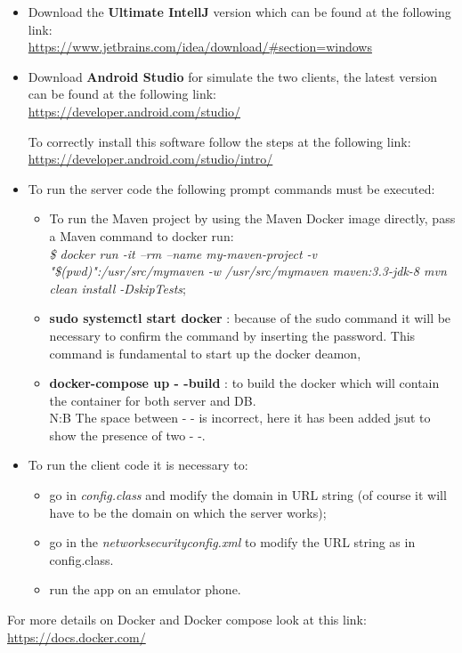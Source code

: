 \begin{itemize}
	\item Download the \textbf{Ultimate IntellJ} version which can be found at the following link:\\
 		\url{https://www.jetbrains.com/idea/download/#section=windows}

	\item Download \textbf{Android Studio} for simulate the two clients, the latest version can be found at the following link:\\
		\url{https://developer.android.com/studio/}

		To correctly install this software follow the steps at the following link:\\
		\url{https://developer.android.com/studio/intro/}

	\item To run the server code the following prompt commands must be executed:\\
	
		\begin{itemize}
			\item To run the  Maven project by using the Maven Docker image directly, pass a Maven command to docker 					run:\\
\textit{\$ docker run -it --rm --name my-maven-project -v "\$(pwd)":/usr/src/mymaven -w /usr/src/mymaven maven:3.3-jdk-8 mvn clean install -DskipTests};
			\item \textbf{ sudo systemctl start docker} : because of the sudo command it will be necessary to confirm the 					command by inserting the password. This command is fundamental to start up the docker deamon,	
			\item \textbf{ docker-compose up - -build} : to build the docker which will contain the container for both server 					and DB.\\N:B The space between - - is incorrect, here it has been added jsut to show the presence of two - -.
		\end{itemize}

	
	\item To run the client code it is necessary to:
		\begin{itemize}
			\item go in \textit{config.class} and modify the domain in URL string (of course it will have to be the domain on 					which the server works);
			\item go in the  \textit{networksecurityconfig.xml}  to modify the URL string as in config.class.
			\item run the app on an emulator phone.
		\end{itemize} 
\end{itemize}

For more details on Docker and Docker compose look at this link:\\
\url{https://docs.docker.com/}
